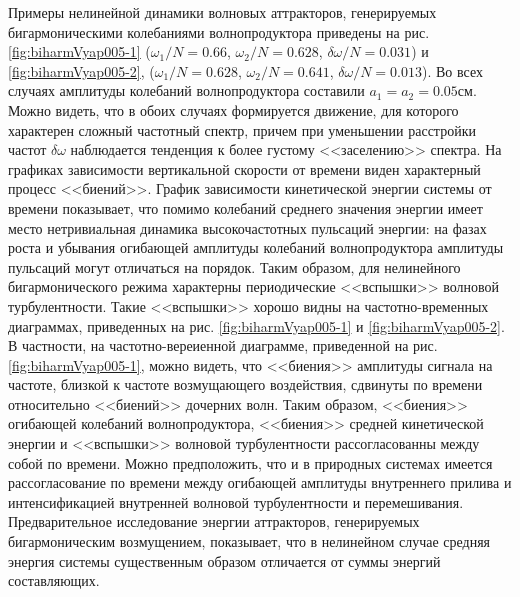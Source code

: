 Примеры нелинейной динамики волновых аттракторов, генерируемых бигармоническими колебаниями волнопродуктора приведены на рис. \ref{fig:biharmVyap005-1} %
($\omega_1/N=0.66$, $\omega_2/N=0.628$, $\delta \omega/N=0.031$) и \ref{fig:biharmVyap005-2}, 
($\omega_1/N=0.628$, $\omega_2/N=0.641$, $\delta \omega/N=0.013$). Во всех случаях амплитуды колебаний волнопродуктора составили $a_{1}=a_{2}=0.05$см. Можно видеть, что в обоих случаях формируется движение, для которого характерен сложный частотный спектр, причем при уменьшении расстройки частот $\delta \omega$ наблюдается тенденция к более густому <<заселению>> спектра.  На графиках зависимости вертикальной скорости от времени виден характерный процесс <<биений>>. График зависимости кинетической энергии системы от времени показывает, что помимо колебаний среднего значения энергии имеет место нетривиальная динамика высокочастотных пульсаций энергии: на фазах роста и убывания огибающей амплитуды колебаний волнопродуктора амплитуды пульсаций могут отличаться на порядок. Таким образом, для нелинейного бигармонического режима характерны периодические <<вспышки>> волновой турбулентности. Такие <<вспышки>> хорошо видны на частотно-временных диаграммах, приведенных на рис.  \ref{fig:biharmVyap005-1} и \ref{fig:biharmVyap005-2}. В частности, на частотно-вереиенной диаграмме, приведенной на рис.  \ref{fig:biharmVyap005-1}, можно видеть, что <<биения>> амплитуды сигнала на частоте, близкой к частоте возмущающего воздействия, сдвинуты по времени относительно <<биений>> дочерних волн. Таким образом, <<биения>> огибающей колебаний волнопродуктора, <<биения>> средней кинетической энергии и <<вспышки>> волновой турбулентности рассогласованны между собой по времени. Можно предположить, что и в природных системах имеется рассогласование по времени между огибающей амплитуды внутреннего прилива и интенсификацией внутренней волновой турбулентности и перемешивания. Предварительное исследование энергии аттракторов, генерируемых бигармоническим возмущением, показывает, что в нелинейном случае средняя энергия системы существенным образом отличается от суммы энергий составляющих.  
